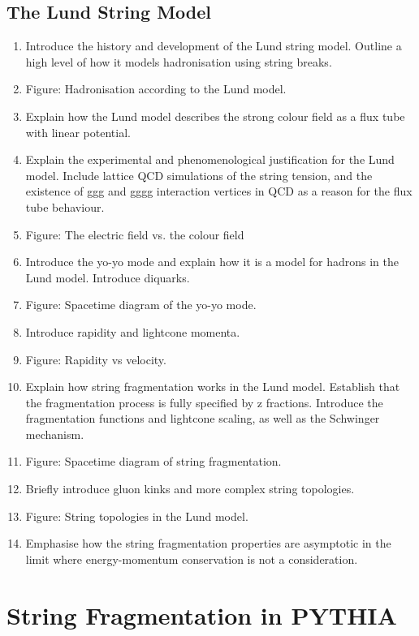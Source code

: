 \documentclass[12pt,a4paper]{report}
\begin{document}
\section{The Lund String Model}
\label{sec:lsm}
\begin{enumerate}
\item Introduce the history and development of the Lund string model. Outline a high level of how it models hadronisation using string breaks.
\item Figure: Hadronisation according to the Lund model.
\item Explain how the Lund model describes the strong colour field as a flux tube with linear potential.
\item Explain the experimental and phenomenological justification for the Lund model. Include lattice QCD simulations of the string tension, and the existence of ggg and gggg interaction vertices in QCD as a reason for the flux tube behaviour.
\item Figure: The electric field vs. the colour field
\item Introduce the yo-yo mode and explain how it is a model for hadrons in the Lund model. Introduce diquarks.
\item Figure: Spacetime diagram of the yo-yo mode.
\item Introduce rapidity and lightcone momenta.
\item Figure: Rapidity vs velocity.
\item Explain how string fragmentation works in the Lund model. Establish that the fragmentation process is fully specified by z fractions. Introduce the fragmentation functions and lightcone scaling, as well as the Schwinger mechanism.
\item Figure: Spacetime diagram of string fragmentation.
\item Briefly introduce gluon kinks and more complex string topologies.
\item Figure: String topologies in the Lund model.
\item Emphasise how the string fragmentation properties are asymptotic in the limit where energy-momentum conservation is not a consideration. 
\end{enumerate}

\chapter{String Fragmentation in PYTHIA}
\end{document}
